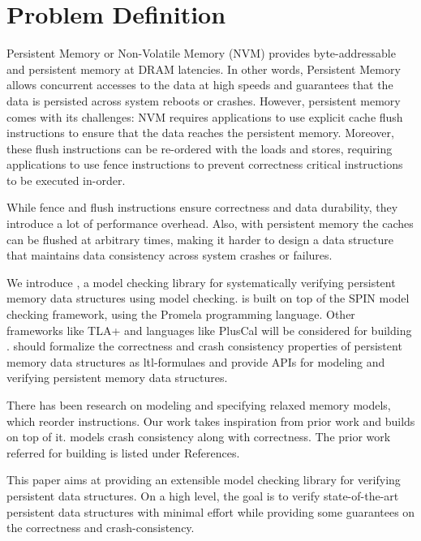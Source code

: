 \section{Problem Definition}

 Persistent Memory or Non-Volatile Memory (NVM)
provides byte-addressable and persistent memory at DRAM latencies. In other words,
Persistent Memory allows concurrent accesses to the data at high speeds and
guarantees that the data is persisted across system reboots or crashes. However,
persistent memory comes with its challenges: NVM requires applications to use
explicit cache flush instructions to ensure that the data reaches the persistent
memory. Moreover, these flush instructions can be re-ordered with the loads and
stores, requiring applications to use fence instructions to prevent correctness
critical instructions to be executed in-order.

 While fence and flush instructions ensure
correctness and data durability, they introduce a lot of performance overhead.
Also, with persistent memory the caches can be flushed at arbitrary times,
making it harder to design a data structure that maintains data consistency
across system crashes or failures.

 We introduce \checker, a model checking
library for systematically verifying persistent memory data structures using
model checking. \Checker is built on top of the SPIN model checking framework,
using the Promela programming language. Other frameworks like TLA+ and languages
like PlusCal will be considered for building \checker. \Checker should formalize
the correctness and crash consistency properties of persistent memory data
structures as ltl-formulaes and provide APIs for modeling and verifying
persistent memory data structures.

 There has been research on modeling and specifying
relaxed memory models, which reorder instructions. Our work takes inspiration
from prior work and builds on top of it. \Checker models crash consistency along
with correctness. The prior work referred for building \checker is listed under
References.

 This paper aims at providing an extensible model
checking library for verifying persistent data structures. On a high level, the
goal is to verify state-of-the-art persistent data structures with minimal
effort while providing some guarantees on the correctness and crash-consistency.
